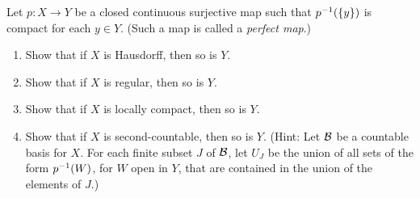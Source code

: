 \documentclass[a4paper, 10pt]{article}
\begin{document}
\begin{problem} 
Let $p: X \to Y$ be a closed continuous surjective map such that ${p}^{-1}(\{y\})$ is compact for each $y \in Y$. (Such a map is called a \textit{perfect map}.)

\begin{enumerate}
\item Show that if $X$ is Hausdorff, then so is $Y$.
\item Show that if $X$ is regular, then so is $Y$.
\item Show that if $X$ is locally compact, then so is $Y$.
\item Show that if $X$ is second-countable, then so is $Y$. (Hint: Let $\mathcal{B}$ be a countable basis for $X$. For each finite subset $J$ of $\mathcal{B}$, let $U_J$ be the union of all sets of the form ${p}^{-1}(W)$, for $W$ open in $Y$, that are contained in the union of the elements of $J$.)
\end{enumerate}
\end{problem}
\end{document}
